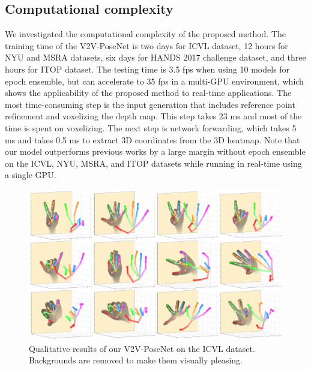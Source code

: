 \subsection{Computational complexity}
We investigated the computational complexity of the proposed method. The training time of the V2V-PoseNet is two days for ICVL dataset, 12 hours for NYU and MSRA datasets, six days for HANDS 2017 challenge dataset, and three hours for ITOP dataset. The testing time is 3.5 fps when using 10 models for epoch ensemble, but can accelerate to 35 fps in a multi-GPU environment, which shows the applicability of the proposed method to real-time applications. The most time-consuming step is the input generation that includes reference point refinement and voxelizing the depth map. This step takes 23 ms and most of the time is spent on voxelizing. The next step is network forwarding, which takes 5 ms and takes 0.5 ms to extract 3D coordinates from the 3D heatmap. Note that our model outperforms previous works by a large margin without epoch ensemble on the ICVL, NYU, MSRA, and ITOP datasets while running in real-time using a single GPU.


\begin{figure}
\begin{center}
   \includegraphics[width=1.0\linewidth]{qualitative_icvl.pdf}
\end{center}
\vspace*{-6mm}
   \caption{Qualitative results of our V2V-PoseNet on the ICVL dataset. Backgrounds are removed to make them visually pleasing.}
\vspace*{-3mm}
\label{fig:qualitative_icvl}
\end{figure}

